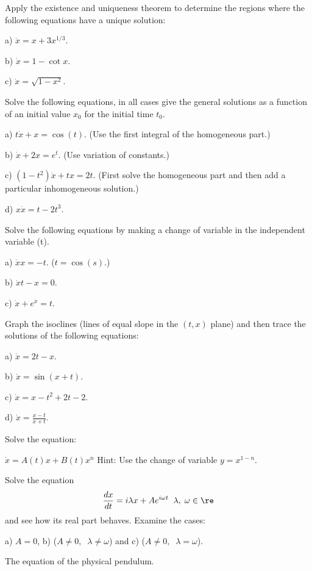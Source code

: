 \bpro[Kiseliov]
Apply the existence and uniqueness theorem to determine the regions
where the following equations have a unique solution:

a) $\dot{x} = x + 3 x^{1/3}$.

b) $\dot{x} = 1 - \cot x$.

c) $\dot{x} = \sqrt{1-x^2}$.
\epro

\bpro[Kiseliov]
Solve the following equations, in all cases give the
general solutions as a function of an initial value $x_0$
for the initial time $t_0$.

a) $t \dot{x} + x = \cos(t)$. (Use the first integral of the homogeneous part.)

b) $\dot{x} + 2x = e^t$. (Use variation of constants.)

c) $(1-t^2)\dot{x} + tx = 2t$. (First solve the homogeneous part and then
add a particular inhomogeneous solution.)

d) $x \dot{x} = t - 2t^3$.
\epro

\bpro[Kiseliov]
Solve the following equations by making a change of variable in
the independent variable (t).

a) $\dot{x}x = -t$. ($t = \cos(s)$.)

b) $\dot{x}t - x =0$.

c) $\dot{x} + e^{\dot{x}} = t$.
\epro

\bpro[Kiseliov]
Graph the isoclines (lines of equal slope in the $(t,x)$ plane)
and then trace the solutions of the following equations:

a) $\dot{x} = 2t - x$.

b) $\dot{x} = \sin(x+t)$.

c) $\dot{x} = x -t^2 + 2t -2$.

d) $\dot{x} = \frac{x-t}{x+t}$.
\epro

\bpro 
Solve the equation:

$\dot{x} = A(t)x + B(t)x^n$ Hint: Use the change of variable $y = x^{1-n}$.
\epro

\bpro 
Solve the equation
\begin{equation}
  \label{eq:osc}
  \frac{dx}{dt} = i\lambda x + A e^{i \omega t} \;\; \lambda, \; \omega \in \re
\end{equation}
%
and see how its real part behaves.
Examine the cases: 

a) $A=0$, 
b) ($A \neq 0, \;\; \lambda \neq \omega$) and
c) ($A \neq 0, \;\; \lambda = \omega$).
\epro

\bpro 
The equation of the physical pendulum.

